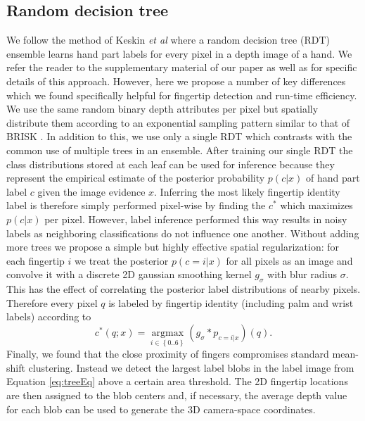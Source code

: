 \documentclass{bmvc2k}
\def\etal{\emph{et al}\bmvaOneDot}
\begin{document}
\subsection{Random decision tree} \label{sec:RDT}
We follow the method of Keskin \etal \cite{KeskinKKA11} where a random decision tree (RDT) ensemble learns hand part labels for every pixel in a depth image of a hand. We refer the reader to the supplementary material of our paper as well as \cite{KeskinKKA11, Shotton11} for specific details of this approach. However, here we propose a number of key differences which we found specifically helpful for fingertip detection and run-time efficiency.  We use the same random binary depth attributes per pixel but spatially distribute them according to an exponential sampling pattern similar to that of BRISK \cite{leutenegger2011brisk}. In addition to this, we use only a single RDT which contrasts with the common use of multiple trees in an ensemble. After training our single RDT the class distributions stored at each leaf can be used for inference because they represent the empirical estimate of the posterior probability $p\left(c | x \right)$ of hand part label $c$ given the image evidence $x$. Inferring the most likely fingertip identity label is therefore simply performed pixel-wise by finding the $c^*$ which maximizes $p\left(c | x \right)$ per pixel. However, label inference performed this way results in noisy labels as neighboring classifications do not influence one another. Without adding more trees we propose a simple but highly effective spatial regularization: for each fingertip $i$ we treat the posterior $p\left(c=i | x \right)$ for all pixels as an image and convolve it with a discrete 2D gaussian smoothing kernel $g_\sigma$ with blur radius $\sigma$.  This has the effect of correlating the posterior label distributions of nearby pixels. Therefore every pixel $q$ is labeled by fingertip identity (including palm and wrist labels)  according to
\begin{equation}\label{eq:treeEq}
c^*\left(q;x\right) = \mathop {\arg \max }\limits_{i \in \left\{0..6 \right\}} \left(g_{\sigma}* p_{c=i|x} \right) \left(q\right).
\end{equation}
Finally, we found that the close proximity of fingers compromises standard mean-shift \cite{meanshift} clustering. Instead we detect the largest label blobs in the label image from Equation \ref{eq:treeEq} above a certain area threshold. The 2D fingertip locations are then assigned to the blob centers and, if necessary, the average depth value for each blob can be used to generate the 3D camera-space coordinates. 
\end{document}
